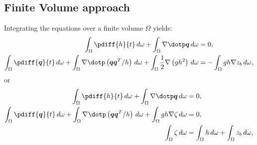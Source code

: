 \subsection*{Finite Volume approach}
Integrating the equations over a finite volume $\Omega$ yields:
\begin{subequations}
    \begin{align}
        \int_\Omega \pdiff{h}{t}\, d\omega
        + \int_\Omega \nabla \dotp \vec{q}\, d\omega & = 0,
        \\
        \int_\Omega \pdiff{\vec{q}}{t}\, d\omega
        + \int_\Omega \nabla \dotp \left( \vec{q}\vec{q}^T/h\right)\, d\omega
        + \int_\Omega \half  \nabla \left( g h^2 \right) \, d\omega & =
        - \int_\Omega gh\nabla z_b\, d\omega,
    \end{align}
    \label{sec:pressure_dependent_on_h}
\end{subequations}
or
\begin{subequations}
\begin{align}
    \int_\Omega \pdiff{h}{t}\, d\omega + \int_\Omega \nabla \dotp \vec{q}\, d\omega & = 0,
    \\
    \int_\Omega \pdiff{\vec{q}}{t}\, d\omega
    + \int_\Omega \nabla \dotp \left( \vec{q}\vec{q}^T/h\right)\, d\omega
    + \int_\Omega gh \nabla \zeta\, d\omega & = 0,
    \\
    \int_\Omega \zeta\, d\omega & = \int_\Omega h\, d\omega + \int_\Omega z_b\, d\omega,
\end{align}
\label{sec:pressure_dependent_on_zeta}
\end{subequations}

